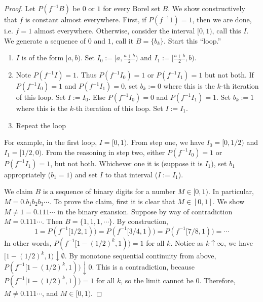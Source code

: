 \documentclass[letterpaper, 12pt]{article}
\begin{document}
\begin{proof}
Let $P(f^{-1}B)$ be $0$ or $1$ for every Borel set $B$. We show  constructively that $f$ is constant almost everywhere. 
First, if $P(f^{-1}{1}) = 1$, then we are done, i.e. $f = 1$ almost everywhere. Otherwise, consider the interval $[0,1)$, call this $I$. We generate a sequence of $0$ and $1$, call it $B = \{b_k\}$.
Start this ``loop.'' 
\begin{enumerate}[1.]
\item
$I$ is of the form $[a,b)$. Set $I_0 := [a, \frac{a+b}{2})$ and $I_1 := [\frac{a+b}{2},b)$.
\item
Note $P(f^{-1}I) = 1$. Thus $P(f^{-1}I_0) = 1$ or $P(f^{-1}I_1) = 1$ but not both. If $P(f^{-1}I_0) = 1$ and $P(f^{-1}I_1) = 0$, set $b_k := 0$ where this is the $k$-th iteration of this loop. 
Set $I := I_0$. 
Else $P(f^{-1}I_0) = 0$ and $P(f^{-1}I_1) = 1$. Set $b_k := 1$ where this is the $k$-th iteration of this loop. Set $I := I_1$.
\item
Repeat the loop
\end{enumerate}
For example, in the first loop, $I = [0,1)$. From step one, we have $I_0 = [0,1/2)$ and $I_1 = [1/2,0)$. From the reasoning in step two, either $P(f^{-1}I_0) = 1$ or $P(f^{-1}I_1) = 1$, but not both. Whichever one it is (suppose it is $I_1$), set $b_1$ appropriately ($b_1 = 1$) and set $I$ to that interval ($I := I_1$).

We claim $B$ is a sequence of binary digits for a number $M \in [0,1)$. In particular, $M = 0.b_1b_2b_3\cdots$. 
To prove the claim, first it is clear that $M \in [0,1]$. We show $M \neq 1 = 0.111\cdots$ in the binary exansion. Suppose by way of contradiction $M = 0.111\cdots$. Then $B = \{1,1,1,\cdots \}$. By construction, 
\[
1 = P(f^{-1}[1/2,1)) = P(f^{-1}[3/4,1)) = P(f^{-1}[7/8,1)) = \cdots
\]
In other words, $P(f^{-1}[1 - (1/2)^k,1)) = 1$ for all $k$. Notice as $k \uparrow \infty$, we have $[1 - (1/2)^k,1) \downarrow \emptyset$. By monotone sequential continuity from above, $P(f^{-1}[1 - (1/2)^k,1)) \downarrow 0$. This is a contradiction, because $P(f^{-1}[1 - (1/2)^k,1)) = 1$ for all $k$, so the limit cannot be $0$. Therefore, $M \neq 0.111\cdots$, and $M \in [0,1)$.


\end{proof}
\end{document}
